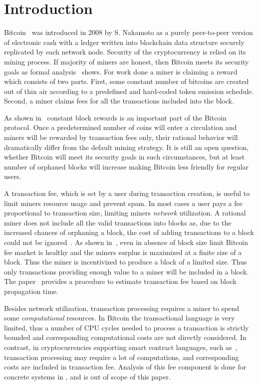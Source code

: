 \documentclass[]{llncs}   %
\begin{document}
\section{Introduction}

Bitcoin~\cite{Nakamoto2008} was introduced in 2008 by S. Nakamoto as a purely
peer-to-peer version of electronic cash with a ledger written into blockchain
data structure securely replicated by each network node. Security of the cryptocurrency 
is relied on its mining process. If majority of miners are honest, then Bitcoin
meets its security goals as formal analysis~\cite{Garay2015} shows. For work
done a miner is claiming a reward which consists of two parts. First, some
constant number of bitcoins are created out of thin air according to a
predefined and hard-coded token emission schedule. Second, a miner claims fees
for all the transactions included into the block.

As shown in~\cite{carlsten2016instability} constant block rewards is an important
part of the Bitcoin protocol. Once a predetermined number of coins will enter a circulation
and miners will be rewarded by transaction fees only, their rational behavior will
dramatically differ from the default mining strategy. It is still an open question, whether
Bitcoin will meet its security goals in such circumstances, but at least number of
orphaned blocks will increase making Bitcoin less friendly for regular users.

A transaction fee, which is set by a user during transaction creation, is
useful to limit miners resource usage and prevent spam. In most cases a user pays a fee proportional to transaction size,
limiting miners {\em network} utilization. A rational miner does not
include all the valid transactions into blocks as, due to the increased
chances of orphaning a block, the cost of adding transactions to a block
could not be ignored~\cite{andersen2013,rizun2015transaction}. As shown
in~\cite{rizun2015transaction}, even in absence of block size limit 
Bitcoin fee market is healthy and the miners surplus is maximized at a
finite size of a block. Thus the miner is incentivized to produce
a block of a limited size. Thus only transactions providing enough value to a miner will be included in a block. The 
paper~\cite{rizun2015transaction} provides a procedure to estimate
transaction fee based on block propagation time.

Besides network utilization, transaction processing requires a miner
to spend some {\em computational} resources.
In Bitcoin the transactional language\cite{script} is very limited, thus
a number of CPU cycles needed to process a transaction
is strictly bounded and corresponding computational costs are not directly
considered. In contrast, in cryptocurrencies supporting smart contract
languages, such as~\cite{seijas2016scripting,tezosScript,solidity},
transaction processing may require a lot of computations, and
corresponding costs are included in transaction fee. Analysis of this fee component is done for concrete systems
in \cite{Earlz2017,luu2015demystifying}, and is out of scope of this paper.
\end{document}
